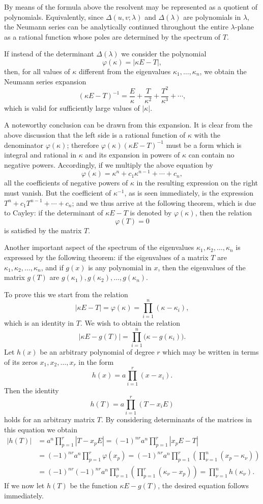 By means of the formula above the resolvent may be represented as a quotient of polynomials. Equivalently, since $\Delta(u,v;\lambda)$ and $\Delta(\lambda)$ are polynomials in $\lambda$, the Neumann series can be analytically continued throughout the entire $\lambda$-plane as a rational function whose poles are determined by the spectrum of $T$.

If instead of the determinant $\Delta(\lambda)$ we consider the polynomial
\[
 \varphi(\kappa)=|\kappa E-T|,
\]
then, for all values of $\kappa$ different from the eigenvalues $\kappa_1,\ldots,\kappa_n$, we obtain the Neumann series expansion
\[
 (\kappa E-T)^{-1}=\frac{E}{\kappa}+\frac{T}{\kappa^2}+\frac{T^2}{\kappa^3}+\cdots,
\]
which is valid for sufficiently large values of $|\kappa|$.

A noteworthy conclusion can be drawn from this expansion. It is clear from the above discussion that the left side is a rational function of $\kappa$ with the denominator $\varphi(\kappa)$; therefore $\varphi(\kappa)(\kappa E-T)^{-1}$ must be a form which is integral and rational in $\kappa$ and its expansion in powers of $\kappa$ can contain no negative powers. Accordingly, if we multiply the above equation by
\[
 \varphi(\kappa)=\kappa^n+c_1\kappa^{n-1}+\cdots+c_n,
\]
all the coefficients of negative powers of $\kappa$ in the resulting expression on the right must vanish. But the coefficient of $\kappa^{-1}$, as is seen immediately, is the expression $T^n+c_1T^{n-1}+\cdots+c_n$; and we thus arrive at the following theorem, which is due to Cayley: if the determinant of $\kappa E-T$ is denoted by $\varphi(\kappa)$, then the relation
\[
 \varphi(T)=0
\]
is satisfied by the matrix $T$.

Another important aspect of the spectrum of the eigenvalues $\kappa_1,\kappa_2,\ldots,\kappa_n$ is expressed by the following theorem: if the eigenvalues of a matrix $T$ are $\kappa_1,\kappa_2,\ldots,\kappa_n$, and if $g(x)$ is any polynomial in $x$, then the eigenvalues of the matrix $g(T)$ are $g(\kappa_1),g(\kappa_2),\ldots,g(\kappa_n)$.

To prove this we start from the relation
\[
 |\kappa E-T|=\varphi(\kappa)=\prod_{i=1}^{n}(\kappa-\kappa_i),
\]
which is an identity in $T$. We wish to obtain the relation
\[
 |\kappa E-g(T)|=\prod_{i=1}^{n}\bigl(\kappa-g(\kappa_i)\bigr).
\]
Let $h(x)$ be an arbitrary polynomial of degree $r$ which may be written in terms of its zeros $x_1,x_2,\ldots,x_r$ in the form
\[
 h(x)=a\prod_{i=1}^{r}(x-x_i).
\]
Then the identity
\[
 h(T)=a\prod_{i=1}^{r}(T-x_iE)
\]
holds for an arbitrary matrix $T$. By considering determinants of the matrices in this equation we obtain
\begin{align*}
|h(T)|
&=a^n\prod_{p=1}^{r}|T-x_pE|
=(-1)^{nr}a^n\prod_{p=1}^{r}|x_pE-T|\\
&=(-1)^{nr}a^n\prod_{p=1}^{r}\varphi(x_p)
=(-1)^{nr}a^n\prod_{p=1}^{r}\left(\prod_{\nu=1}^{n}(x_p-\kappa_\nu)\right)\\
&=(-1)^{nr}(-1)^{nr}a^n\prod_{\nu=1}^{n}\left(\prod_{p=1}^{r}(\kappa_\nu-x_p)\right)
=\prod_{\nu=1}^{n}h(\kappa_\nu).
\end{align*}
If we now let $h(T)$ be the function $\kappa E-g(T)$, the desired equation follows immediately.


